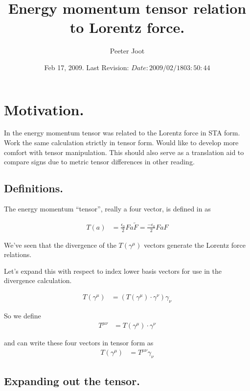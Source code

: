 \documentclass{article}
\title{ Energy momentum tensor relation to Lorentz force. }
\author{Peeter Joot}
\date{ Feb 17, 2009.  Last Revision: $Date: 2009/02/18 03:50:44 $ }
\begin{document}
\maketitle{}

\section{ Motivation. }

In \cite{PJstressEnergyLorentz} the energy momentum tensor was related
to the Lorentz force in STA form.  Work the same calculation strictly in
tensor form.  Would like to %
develop more comfort with tensor manipulation.  This should also serve
as a translation aid to compare signs due to metric tensor differences 
in other reading.

\subsection{ Definitions. }

The energy momentum ``tensor'', really a four vector, is defined
in \cite{doran2003gap}
as

\begin{align}
T(a) &= 
\frac{\epsilon_0}{2} F a \tilde{F} = \frac{-\epsilon_0}{2} F a {F} 
\end{align}

We've seen that the divergence of the $T(\gamma^\mu)$ vectors generate
the Lorentz force relations.

Let's expand this with respect to index lower basis vectors for use in the
divergence calculation.

\begin{align}
T(\gamma^\mu) &= (T(\gamma^\mu) \cdot \gamma^\nu) \gamma_\nu 
\end{align}

So we define
\begin{align}
T^{\mu \nu} 
&= T(\gamma^\mu) \cdot \gamma^\nu
\end{align}

and can write these four vectors in tensor form as
\begin{align}
T(\gamma^\mu) &= T^{\mu \nu} \gamma_\nu 
\end{align}

\subsection{ Expanding out the tensor. }
\end{document}
